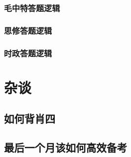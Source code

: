 \documentclass[lang=cn,blue,10pt,scheme=chinese,twocol]{zznote}
\begin{document}
\subsection{毛中特答题逻辑}
\subsection{思修答题逻辑}
\subsection{时政答题逻辑}

\chapter{杂谈}
\section{如何背肖四}
\section{最后一个月该如何高效备考}
\end{document}

